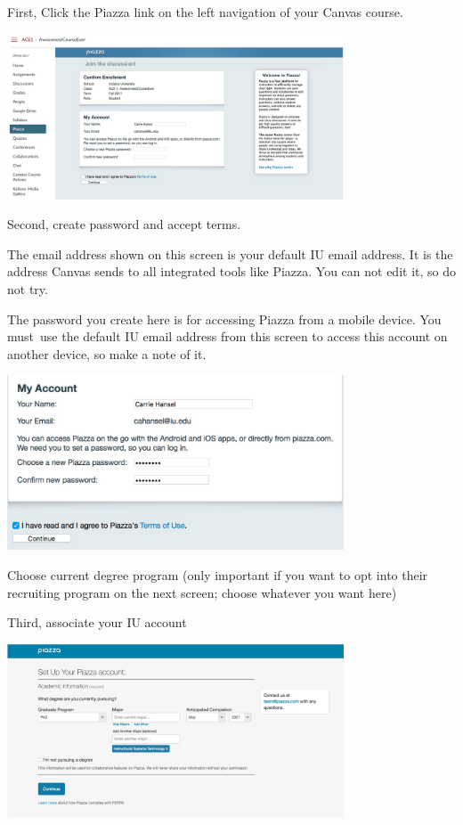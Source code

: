 First, Click the Piazza link on the left navigation of your Canvas
course.

\includegraphics[width=0.75\textwidth]{images/piazza/image3.png}

Second, create password and accept terms.


The email address shown on this screen is your default IU
email address. It is the address Canvas sends to all integrated tools
like Piazza. You can not edit it, so do not try.

The password you create here is for accessing Piazza from a
mobile device. You must~use the default IU email address from this
screen to access this account on another device, so make a note of it.

\includegraphics[width=0.75\textwidth]{images/piazza/image1.png}

Choose current degree program (only important if you want to opt into
their recruiting program on the next screen; choose whatever you want
here)

Third, associate your IU account

\includegraphics[width=0.75\textwidth]{images/piazza/image4.png}

